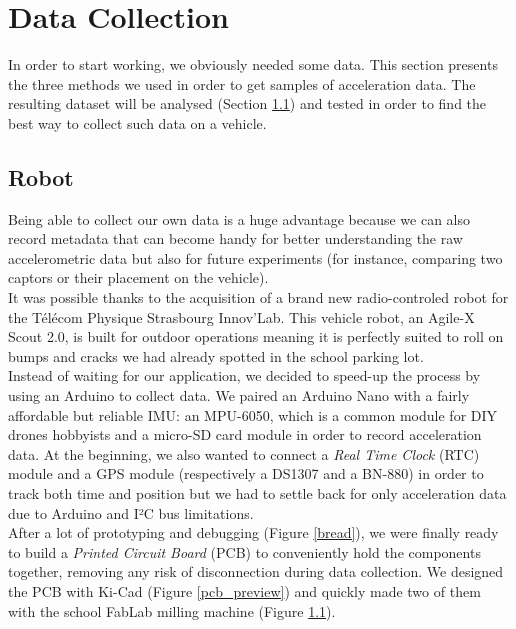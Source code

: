 \section{Data Collection}
\label{data_collection}

In order to start working, we obviously needed some data. This section presents the three methods we used in order to get samples of acceleration data. The resulting dataset will be analysed (Section \ref{}) and tested in order to find the best way to collect such data on a vehicle.

\subsection{Robot}
Being able to collect our own data is a huge advantage because we can also record metadata that can become handy for better understanding the raw accelerometric data but also for future experiments (for instance, comparing two captors or their placement on the vehicle).\\

It was possible thanks to the acquisition of a brand new radio-controled robot for the Télécom Physique Strasbourg Innov'Lab. This vehicle robot, an Agile-X Scout 2.0, is built for outdoor operations meaning it is perfectly suited to roll on bumps and cracks we had already spotted in the school parking lot.\\

Instead of waiting for our application, we decided to speed-up the process by using an Arduino to collect data. We paired an Arduino Nano with a fairly affordable but reliable IMU: an MPU-6050, which is a common module for DIY drones hobbyists and a micro-SD card module in order to record acceleration data. At the beginning, we also wanted to connect a \textit{Real Time Clock} (RTC) module and a GPS module (respectively a DS1307 and a BN-880) in order to track both time and position but we had to settle back for only acceleration data due to Arduino and I²C bus limitations.\\

After a lot of prototyping and debugging (Figure \ref{bread}), we were finally ready to build a \textit{Printed Circuit Board} (PCB) to conveniently hold the components together, removing any risk of disconnection during data collection. We designed the PCB with Ki-Cad (Figure \ref{pcb_preview}) and quickly made two of them with the school FabLab milling machine (Figure \ref{}).\\

